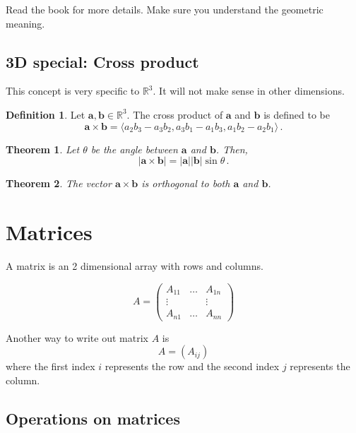 \documentclass[
]{book}
\newtheorem{theorem}{Theorem}[chapter]
\theoremstyle{definition}
\newtheorem{definition}{Definition}[chapter]
\theoremstyle{definition}
\theoremstyle{definition}
\theoremstyle{definition}
\theoremstyle{remark}
\begin{document}
Read the book for more details.
Make sure you understand the geometric meaning.

\subsection{3D special: Cross product}\label{d-special-cross-product}

This concept is very specific to \(\mathbb{R}^3\).
It will not make sense in other dimensions.

\begin{definition}
Let \(\mathbf{a}, \mathbf{b} \in \mathbb{R}^3\).
The cross product of \(\mathbf{a}\) and \(\mathbf{b}\) is defined to be
\begin{equation*}
    \mathbf{a} \times \mathbf{b} = \langle a_2 b_3 - a_3 b_2, a_3b_1 - a_1 b_3, a_1b_2 - a_2b_1 \rangle \,.
\end{equation*}
\end{definition}

\begin{theorem}
Let \(\theta\) be the angle between \(\mathbf{a}\) and \(\mathbf{b}\). Then,
\begin{equation*}
    | \mathbf{a} \times \mathbf{b} | = |\mathbf{a}||\mathbf{b}| \sin\theta \,.
\end{equation*}
\end{theorem}

\begin{theorem}
The vector \(\mathbf{a}\times \mathbf{b}\) is orthogonal to both \(\mathbf{a}\) and \(\mathbf{b}\).
\end{theorem}

\section{Matrices}\label{matrices}

A matrix is an 2 dimensional array with rows and columns.

\[ A = \begin{pmatrix} A_{11} & \dots & A_{1n}\\ \vdots & & \vdots \\ A_{n1} & \dots & A_{nn}  \end{pmatrix}\]

Another way to write out matrix \(A\) is
\[ A = (A_{ij})\]
where the first index \(i\) represents the row and the second index \(j\) represents the column.

\subsection{Operations on matrices}\label{operations-on-matrices}
\end{document}
